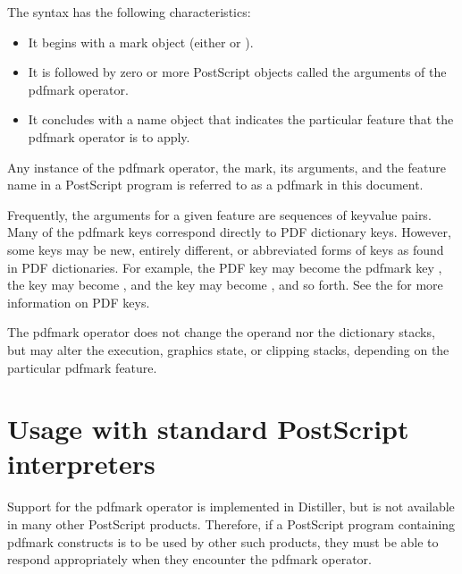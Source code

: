 \documentclass[letterpaper,12pt,english,openany,oneside]{sphinxmanual}
\begin{document}
\begin{sphinxVerbatim}[commandchars=\\\{\}]
\PYG{p}{[} 
  
  
\end{sphinxVerbatim}

The syntax has the following characteristics:
\begin{itemize}
\item {} 
It begins with a mark object (either  or \sphinxcode{\sphinxupquote{{[}}} ).

\item {} 
It is followed by zero or more PostScript objects called the arguments of the pdfmark operator.

\item {} 
It concludes with a name object that indicates the particular feature that the pdfmark operator is to apply.

\end{itemize}

Any instance of the pdfmark operator, the mark, its arguments, and the feature name in a PostScript program is referred to as a pdfmark in this document.

Frequently, the arguments for a given feature are sequences of key\sphinxhyphen{}value pairs. Many of the pdfmark keys correspond directly to PDF dictionary keys. However, some keys may be new, entirely different, or abbreviated forms of keys as found in PDF dictionaries. For example, the PDF  key may become the pdfmark key  , the  key may become  , and the  key may become  , and so forth. See the  for more information on PDF keys.

The pdfmark operator does not change the operand nor the dictionary stacks, but may alter the execution, graphics state, or clipping stacks, depending on the particular pdfmark feature.


\section{Usage with standard PostScript interpreters}
\label{\detokenize{pdfmark_Syntax:usage-with-standard-postscript-interpreters}}
Support for the pdfmark operator is implemented in Distiller, but is not available in many other PostScript products. Therefore, if a PostScript program containing pdfmark constructs is to be used by other such products, they must be able to respond appropriately when they encounter the pdfmark operator.
\end{document}
